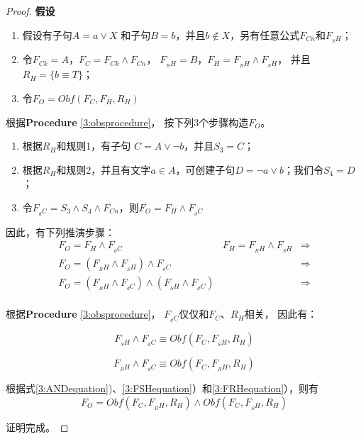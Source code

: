 \begin{proof}
 \textbf{假设}
 \begin{enumerate}
 \item 假设有子句$A=a\vee X$ 和子句$B=b$，并且$b\notin X$，另有任意公式$F_{Cn}$和$F_{_SH}$；
 \item 令$F_{Ck} =A$，$F_C=F_{Ck} \wedge F_{Cn}$，
           $F_{_RH}=B$，$F_H=F_{_RH}\wedge F_{_SH}$， 并且 $R_H=\{b\equiv T\}$；
 \item 令$F_O=Obf(F_C,F_H,R_H)$
 \end{enumerate}
 根据\textbf{Procedure} \ref{3:obsprocedure}， 按下列3个步骤构造$F_O$。
 \begin{enumerate}
 \item 根据$R_H$和规则1，有子句 $C=A\vee \neg b$，并且$S_3=C$；
 \item 根据$R_H$和规则2，并且有文字$a\in A$，可创建子句$D=\neg a\vee b$；我们令$S_4=D$；
 \item 令$F_{_dC} =S_3\wedge S_4 \wedge F_{Cn}$，则$F_O=F_H \wedge F_{_dC}$
 \end{enumerate}

因此，有下列推演步骤：
 \begin{equation}\label{3:ANDequation}
 \begin{array}{ccc}
 F_O  =  F_H \wedge F_{_dC}                                     & F_H=F_{_RH}\wedge F_{_SH}&\Longrightarrow\\
 F_O  =  (F_{_RH}\wedge F_{_SH})\wedge F_{_dC}                   &                        &\Longrightarrow\\
 F_O  =  (F_{_RH} \wedge F_{_dC})\wedge (F_{_SH} \wedge F_{_dC})  &                        &\Longrightarrow\\
 \end{array}
 \end{equation}

根据\textbf{Procedure} \ref{3:obsprocedure}， $F_{_dC}$仅仅和$F_C$、$R_H$相关， 因此有：

\begin{equation}\label{3:FSHequation}
 F_{_SH} \wedge F_{_dC} \equiv Obf(F_C,F_{_SH},R_H)
\end{equation}

\begin{equation}\label{3:FRHequation}
 F_{_RH} \wedge F_{_dC} \equiv Obf(F_C,F_{_RH},R_H)
\end{equation}

根据式\ref{3:ANDequation})、\ref{3:FSHequation}）和\ref{3:FRHequation}），则有
\begin{equation}
 F_O  = Obf(F_C,F_{_RH},R_H)\wedge Obf(F_C,F_{_SH},R_H)
\end{equation}

证明完成。
\end{proof}

